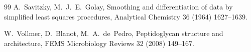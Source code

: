 \documentclass[preprint,12pt]{elsarticle}
\begin{document}
\begin{thebibliography}{99}
A.~Savitzky, M.~J.~E.~Golay,
Smoothing and differentiation of data by simplified least squares procedures,
Analytical Chemistry 36 (1964) 1627--1639.

W.~Vollmer, D.~Blanot, M.~A.~de~Pedro,
Peptidoglycan structure and architecture,
FEMS Microbiology Reviews 32 (2008) 149--167.


\end{thebibliography}
\end{document}
